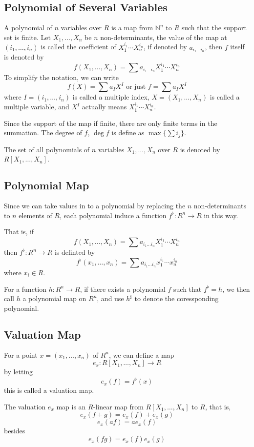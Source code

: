 \documentclass{article}
\begin{document}
\subsection{Polynomial of Several Variables}
A polynomial of $n$ variables over $R$ is a map from
$\mathbb N^n$ to $R$ such that the support set is finite.
Let $X_1, \dots, X_n$ be $n$ non-determinants,
the value of the map at $(i_1, \dots, i_n)$
is called the coefficient of $X_1^{i_1}\cdots X_n^{i_n}$,
if denoted by $a_{i_1\dots i_n}$, then $f$ itself is denoted by
$$f(X_1, \dots, X_n) = \sum a_{i_1\dots i_n} X_1^{i_1}\cdots X_n^{i_n}$$
To simplify the notation, we can write
$$f(X) = \sum a_I X^I\mbox{ or just } f = \sum a_I X^I$$
where $I = (i_1, \dots, i_n)$ is called a multiple index,
$X = (X_1, \dots, X_n)$ is called a multiple variable,
and $X^I$ actually means $X_1^{i_1}\cdots X_n^{i_n}$.

Since the support of the map if finite, there are only finite terms
in the summation. The degree of $f$, $\deg f$ is define as $\max \{\sum i_j\}$.

 The set of all polynomials of $n$ variables $X_1, \dots, X_n$
over $R$ is denoted by $R[X_1, \dots, X_n]$.

\subsection{Polynomial Map}
Since we can take values in to a polynomial by replacing
the $n$ non-determinants to $n$ elements of $R$,
each polynomial induce a function $f^\flat : R^n \to R$ in this way.

That is, if
$$f(X_1, \dots, X_n) = \sum a_{i_1\dots i_n} X_1^{i_1}\cdots X_n^{i_n}$$
then $f^\flat : R^n \to R$ is definted by
$$f^\flat(x_1, \dots, x_n) = \sum a_{i_1\dots i_n} x_1^{i_1}\cdots x_n^{i_n}$$
where $x_i \in R$.

For a function $h : R^n \to R$, if there exists a polynomial $f$ such
that $f^\flat = h$, we then call $h$ a polynomial map on $R^n$,
and use $h^\sharp$ to denote the coressponding polynomial.

\subsection{Valuation Map}
For a point $x = (x_1, \dots, x_n)$ of $R^n$, we can define a map
$$e_x : R[X_1, \dots, X_n] \to R$$ by letting
$$e_x(f) = f^\flat(x)$$
this is called a valuation map.

The valuation $e_x$ map is an $R$-linear map from $R[X_1, \dots, X_n]$ to $R$, that is,
$$e_x(f + g) = e_x(f) + e_x(g)$$
$$e_x(af) = a e_x(f)$$
besides
$$e_x(fg) = e_x(f) e_x(g)$$
\end{document}
